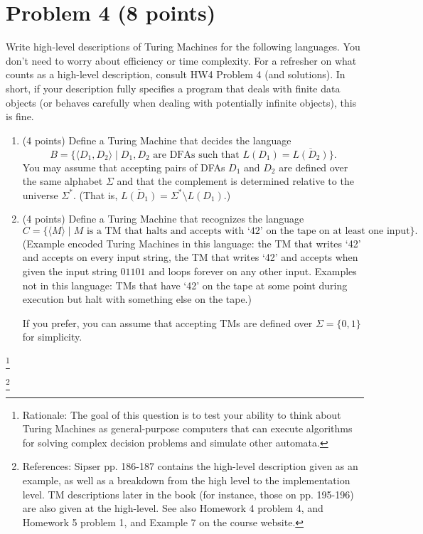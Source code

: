 \documentclass[letterpaper,11pt,twoside]{article}
\theoremstyle{plain}
\theoremstyle{definition}
\theoremstyle{remark}
\theoremstyle{restate}
\newcommand\blfootnote[1]{%
  \begingroup
  \renewcommand\thefootnote{}\footnote{#1}%
  \addtocounter{footnote}{-1}%
  \endgroup
}
\begin{document}
\section{Problem 4 (8 points)}
    Write high-level descriptions of Turing Machines for the following languages. You don't need to worry about efficiency or time complexity. For a refresher on what counts as a high-level description, consult HW4 Problem 4 (and solutions). In short, if your description fully specifies a program that deals with finite data objects (or behaves carefully when dealing with potentially infinite objects), this is fine.
    \begin{enumerate}
        \item (4 points) Define a Turing Machine that decides the language
        \[
            B = \{ \langle D_1, D_2 \rangle \; | \; D_1, D_2 \text{ are DFAs such that } L(D_1) = \overline{L(D_2)} \}.
        \]
        You may assume that accepting pairs of DFAs $D_1$ and $D_2$ are defined over the same alphabet $\Sigma$ and that the complement is determined relative to the universe $\Sigma^*$. (That is, $\overline{L(D_1)} = \Sigma^* \setminus L(D_1)$.)
        
        \item (4 points) Define a Turing Machine that recognizes the language
        \[
            C = \{ \langle M \rangle \; | \; M \text{ is a TM that halts and accepts with `42' on the tape on at least one input}\}.
        \]
        (Example encoded Turing Machines in this language: the TM that writes `42' and accepts on every input string, the TM that writes `42' and accepts when given the input string $01101$ and loops forever on any other input. Examples not in this language: TMs that have `42' on the tape at some point during execution but halt with something else on the tape.)
        
        If you prefer, you can assume that accepting TMs are defined over $\Sigma = \{0,1\}$ for simplicity.
    \end{enumerate}
    
    \blfootnote{ Rationale: The goal of this question is to test your ability to think about Turing Machines as general-purpose computers that can execute algorithms for solving complex decision problems and simulate other automata.}  
    \blfootnote{ References:  Sipser pp. 186-187 contains the high-level description given as an example, as well as a breakdown from the high level to the implementation level. TM descriptions later in the book (for instance, those on pp. 195-196) are also given at the high-level. See also Homework 4 problem 4, and Homework 5 problem 1, and Example 7 on the course website. }
    
\end{document}
